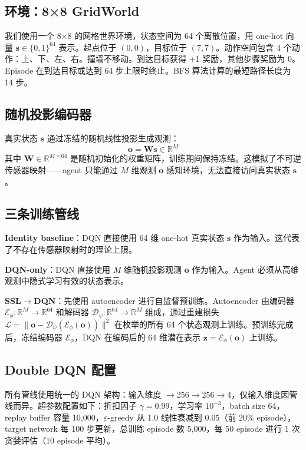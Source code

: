 \documentclass[11pt,a4paper]{ctexart}
\begin{document}
\subsection{环境：8×8 GridWorld}

我们使用一个 8×8 的网格世界环境，状态空间为 64 个离散位置，用 one-hot 向量 $\mathbf{s} \in \{0,1\}^{64}$ 表示。起点位于 $(0,0)$，目标位于 $(7,7)$。动作空间包含 4 个动作：上、下、左、右。撞墙不移动。到达目标获得 +1 奖励，其他步骤奖励为 0。Episode 在到达目标或达到 64 步上限时终止。BFS 算法计算的最短路径长度为 14 步。

\subsection{随机投影编码器}

真实状态 $\mathbf{s}$ 通过冻结的随机线性投影生成观测：
\begin{equation}
\mathbf{o} = \mathbf{W} \mathbf{s} \in \mathbb{R}^M
\end{equation}
其中 $\mathbf{W} \in \mathbb{R}^{M \times 64}$ 是随机初始化的权重矩阵，训练期间保持冻结。这模拟了不可逆传感器映射——agent 只能通过 $M$ 维观测 $\mathbf{o}$ 感知环境，无法直接访问真实状态 $\mathbf{s}$。

\subsection{三条训练管线}

\textbf{Identity baseline}：DQN 直接使用 64 维 one-hot 真实状态 $\mathbf{s}$ 作为输入。这代表了不存在传感器映射时的理论上限。

\textbf{DQN-only}：DQN 直接使用 $M$ 维随机投影观测 $\mathbf{o}$ 作为输入。Agent 必须从高维观测中隐式学习有效的状态表示。

\textbf{SSL$\to$DQN}：先使用 autoencoder 进行自监督预训练。Autoencoder 由编码器 $\mathcal{E}_\phi: \mathbb{R}^M \to \mathbb{R}^{64}$ 和解码器 $\mathcal{D}_\psi: \mathbb{R}^{64} \to \mathbb{R}^M$ 组成，通过重建损失 $\mathcal{L} = \|\mathbf{o} - \mathcal{D}_\psi(\mathcal{E}_\phi(\mathbf{o}))\|^2$ 在枚举的所有 64 个状态观测上训练。预训练完成后，冻结编码器 $\mathcal{E}_\phi$，DQN 在编码后的 64 维潜在表示 $\mathbf{z} = \mathcal{E}_\phi(\mathbf{o})$ 上训练。

\subsection{Double DQN 配置}

所有管线使用统一的 DQN 架构：输入维度 $\to 256 \to 256 \to 4$，仅输入维度因管线而异。超参数配置如下：折扣因子 $\gamma = 0.99$，学习率 $10^{-3}$，batch size 64，replay buffer 容量 10,000，$\varepsilon$-greedy 从 1.0 线性衰减到 0.05（前 20\% episode），target network 每 100 步更新，总训练 episode 数 5,000，每 50 episode 进行 1 次贪婪评估（10 episode 平均）。
\end{document}

